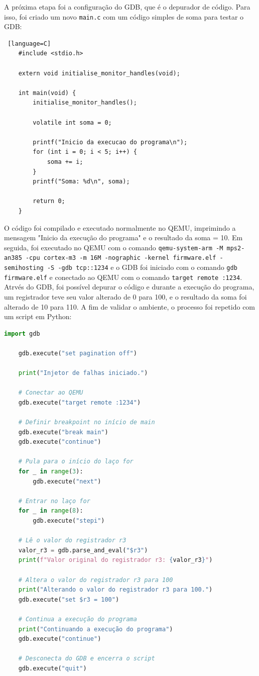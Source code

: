 \documentclass[12pt,a4paper]{article}
\begin{document}
A próxima etapa foi a configuração do GDB, que é o depurador de código. Para isso, foi criado um novo \texttt{main.c} com um código simples de soma para testar o GDB:
\begin{lstlisting} [language=C]
    #include <stdio.h>

    extern void initialise_monitor_handles(void);

    int main(void) {
        initialise_monitor_handles();

        volatile int soma = 0;

        printf("Inicio da execucao do programa\n");
        for (int i = 0; i < 5; i++) {
            soma += i;
        }
        printf("Soma: %d\n", soma);

        return 0;
    }
\end{lstlisting}
O código foi compilado e executado normalmente no QEMU, imprimindo a mensagem "Inicio da execução do programa" e o resultado da soma = 10. Em seguida, foi executado no QEMU com o comando \texttt{qemu-system-arm -M mps2-an385 -cpu cortex-m3 -m 16M -nographic -kernel firmware.elf -semihosting -S -gdb tcp::1234} e o GDB foi iniciado com o comando \texttt{gdb firmware.elf} e conectado ao QEMU com o comando \texttt{target remote :1234}.
Atrvés do GDB, foi possível depurar o código e durante a execução do programa, um registrador teve seu valor alterado de 0 para 100, e o resultado da soma foi alterado de 10 para 110. A fim de validar o ambiente, o processo foi repetido com um script em Python:
\begin{lstlisting}[language=Python]
    import gdb

    gdb.execute("set pagination off")

    print("Injetor de falhas iniciado.")

    # Conectar ao QEMU
    gdb.execute("target remote :1234")

    # Definir breakpoint no início de main
    gdb.execute("break main")
    gdb.execute("continue")

    # Pula para o início do laço for
    for _ in range(3):
        gdb.execute("next")

    # Entrar no laço for
    for _ in range(8):
        gdb.execute("stepi")

    # Lê o valor do registrador r3
    valor_r3 = gdb.parse_and_eval("$r3")
    print(f"Valor original do registrador r3: {valor_r3}")

    # Altera o valor do registrador r3 para 100
    print("Alterando o valor do registrador r3 para 100.")
    gdb.execute("set $r3 = 100")

    # Continua a execução do programa
    print("Continuando a execução do programa")
    gdb.execute("continue")

    # Desconecta do GDB e encerra o script
    gdb.execute("quit")

\end{lstlisting}
\end{document}
